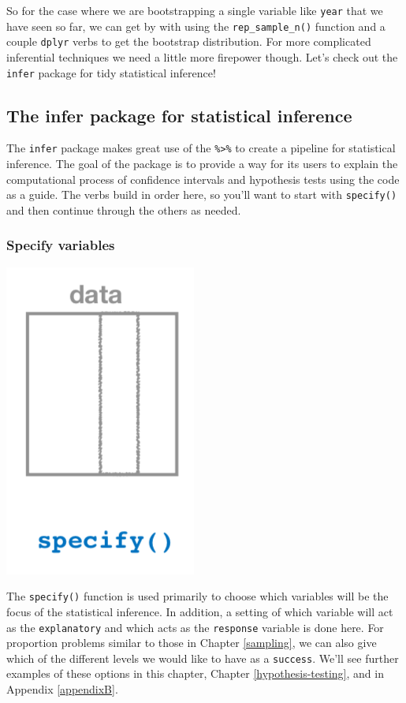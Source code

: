 \documentclass[12pt, krantz2,]{krantz}
\begin{document}
So for the case where we are bootstrapping a single variable like \texttt{year} that we have seen so far, we can get by with using the \texttt{rep\_sample\_n()} function and a couple \texttt{dplyr} verbs to get the bootstrap distribution. For more complicated inferential techniques we need a little more firepower though. Let's check out the \texttt{infer} package for tidy statistical inference!

\hypertarget{the-infer-package-for-statistical-inference}{%
\subsection{The infer package for statistical inference}\label{the-infer-package-for-statistical-inference}}

The \texttt{infer} package makes great use of the \texttt{\%\textgreater{}\%} to create a pipeline for statistical inference. The goal of the package is to provide a way for its users to explain the computational process of confidence intervals and hypothesis tests using the code as a guide. The verbs build in order here, so you'll want to start with \texttt{specify()} and then continue through the others as needed.

\hypertarget{specify-variables}{%
\subsubsection*{Specify variables}\label{specify-variables}}


\begin{center}\includegraphics[width=0.3\linewidth]{images/flowcharts/infer/specify} \end{center}

The \texttt{specify()} function is used primarily to choose which variables will be the focus of the statistical inference. In addition, a setting of which variable will act as the \texttt{explanatory} and which acts as the \texttt{response} variable is done here. For proportion problems similar to those in Chapter \ref{sampling}, we can also give which of the different levels we would like to have as a \texttt{success}. We'll see further examples of these options in this chapter, Chapter \ref{hypothesis-testing}, and in Appendix \ref{appendixB}.
\end{document}
